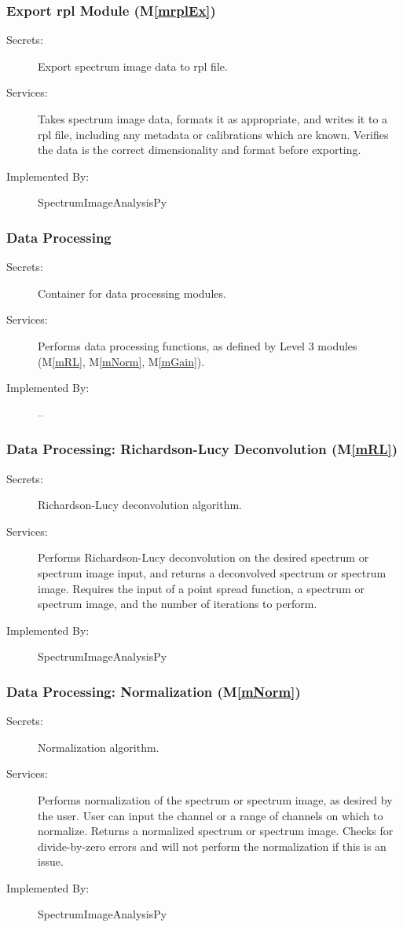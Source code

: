 \documentclass[12pt, titlepage]{article}
\newcommand{\mref}[1]{M\ref{#1}}
\newcommand{\progname}{SpectrumImageAnalysisPy}
\begin{document}
\subsubsection{Export rpl Module (\mref{mrplEx})}
\begin{description}
	\item[Secrets:]Export spectrum image data to rpl file.
	\item[Services:]Takes spectrum image data, formats it as appropriate, and
writes it to a rpl file, including any metadata or calibrations which are known.
Verifies the data is the correct dimensionality and format before exporting.
	\item[Implemented By:] \progname
\end{description}

\subsubsection{Data Processing}
\begin{description}
	\item[Secrets:]Container for data processing modules.
	\item[Services:]Performs data processing functions, as defined by Level 3
modules (\mref{mRL}, \mref{mNorm}, \mref{mGain}).
	\item[Implemented By:] --
\end{description}

\subsubsection{Data Processing: Richardson-Lucy Deconvolution (\mref{mRL})}
\begin{description}
	\item[Secrets:]Richardson-Lucy deconvolution algorithm.
	\item[Services:]Performs Richardson-Lucy deconvolution on the desired spectrum
or spectrum image input, and returns a deconvolved spectrum or spectrum image.
Requires the input of a point spread function, a spectrum or spectrum image, and
the number of iterations to perform.
	\item[Implemented By:] \progname
\end{description}

\subsubsection{Data Processing: Normalization (\mref{mNorm})}
\begin{description}
	\item[Secrets:]Normalization algorithm.
	\item[Services:]Performs normalization of the spectrum or spectrum image, as
desired by the user. User can input the channel or a range of channels on which
to normalize. Returns a normalized spectrum or spectrum image. Checks for
divide-by-zero errors and will not perform the normalization if this is an
issue.
	\item[Implemented By:] \progname
\end{description}
\end{document}
